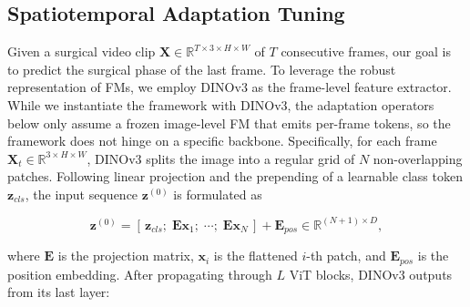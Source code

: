 

\subsection{Spatiotemporal Adaptation Tuning}  %
\label{sec:method:video}


Given a surgical video clip $\mathbf{X} \in \mathbb{R}^{T \times 3 \times H \times W}$ of $T$ consecutive frames, our goal is to predict the surgical phase of the last frame. To leverage the robust representation of FMs, we employ DINOv3 as the frame-level feature extractor. While we instantiate the framework with DINOv3, the adaptation operators below only assume a frozen image-level FM that emits per-frame tokens, so the framework does not hinge on a specific backbone. Specifically, for each frame $\mathbf{X}_t \in \mathbb{R}^{3 \times H \times W}$, DINOv3 splits the image into a regular grid of $N$ non-overlapping patches. Following linear projection and the prepending of a learnable class token $\mathbf{z}_{cls}$, the input sequence $\mathbf{z}^{(0)}$ is formulated as

\begin{equation}
  \mathbf{z}^{(0)} = [\,\mathbf{z}_{cls};\; \mathbf{E}\mathbf{x}_1;\; \cdots;\; \mathbf{E}\mathbf{x}_N\,]
  + \mathbf{E}_{pos}\in\mathbb{R}^{(N+1)\times D},
\end{equation}

\noindent where $\mathbf{E}$ is the projection matrix, $\mathbf{x}_i$ is the flattened $i$-th patch, and $\mathbf{E}_{pos}$ is the position embedding. After propagating through $L$ ViT blocks, DINOv3 outputs from its last layer:

